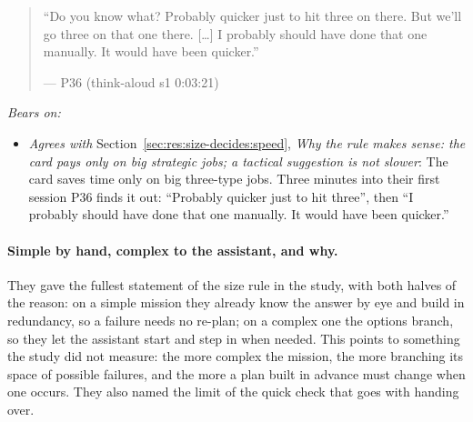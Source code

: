 \begin{quote}\small
``Do you know what? Probably quicker just to hit three on there. But we'll go three on that one there. [\ldots{}] I probably should have done that one manually. It would have been quicker.''\par\hfill--- P36 (think-aloud s1 0:03:21)
\end{quote}

\noindent\textit{Bears on:}
\begin{itemize}[leftmargin=1.2em,itemsep=1pt]\small
\item \textit{Agrees with} Section~\ref{sec:res:size-decides:speed}, \emph{Why the rule makes sense: the card pays only on big strategic jobs; a tactical suggestion is not slower}: The card saves time only on big three-type jobs. Three minutes into their first session P36 finds it out: ``Probably quicker just to hit three'', then ``I probably should have done that one manually. It would have been quicker.''
\end{itemize}


\label{sec:qual:practitioner:pt-branching-paths}\paragraph{Simple by hand, complex to the assistant, and why.}
They gave the fullest statement of the size rule in the study, with both halves of the reason: on a simple mission they already know the answer by eye and build in redundancy, so a failure needs no re-plan; on a complex one the options branch, so they let the assistant start and step in when needed. This points to something the study did not measure: the more complex the mission, the more branching its space of possible failures, and the more a plan built in advance must change when one occurs. They also named the limit of the quick check that goes with handing over.

